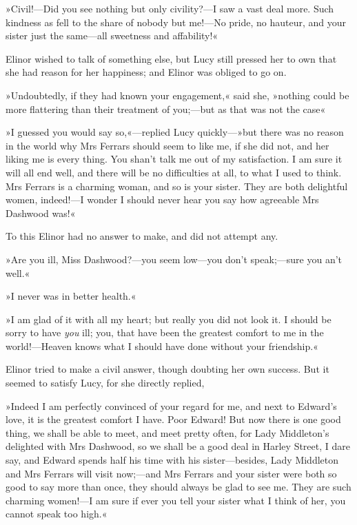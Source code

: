 »Civil!—Did you see nothing but only civility?—I saw a vast deal more. Such kindness as fell to the share of nobody but me!—No pride, no hauteur, and your sister just the same—all sweetness and affability!«

Elinor wished to talk of something else, but Lucy still pressed her to own that she had reason for her happiness; and Elinor was obliged to go on.

»Undoubtedly, if they had known your engagement,« said she, »nothing could be more flattering than their treatment of you;—but as that was not the case\longdash«

»I guessed you would say so,«—replied Lucy quickly—»but there was no reason in the world why Mrs Ferrars should seem to like me, if she did not, and her liking me is every thing. You shan’t talk me out of my satisfaction. I am sure it will all end well, and there will be no difficulties at all, to what I used to think. Mrs Ferrars is a charming woman, and so is your sister. They are both delightful women, indeed!—I wonder I should never hear you say how agreeable Mrs Dashwood was!«

To this Elinor had no answer to make, and did not attempt any.

»Are you ill, Miss Dashwood?—you seem low—you don’t speak;—sure you an’t well.«

»I never was in better health.«

»I am glad of it with all my heart; but really you did not look it. I should be sorry to have \textit{you} ill; you, that have been the greatest comfort to me in the world!—Heaven knows what I should have done without your friendship.«

Elinor tried to make a civil answer, though doubting her own success. But it seemed to satisfy Lucy, for she directly replied,

»Indeed I am perfectly convinced of your regard for me, and next to Edward’s love, it is the greatest comfort I have. Poor Edward! But now there is one good thing, we shall be able to meet, and meet pretty often, for Lady Middleton’s delighted with Mrs Dashwood, so we shall be a good deal in Harley Street, I dare say, and Edward spends half his time with his sister—besides, Lady Middleton and Mrs Ferrars will visit now;—and Mrs Ferrars and your sister were both so good to say more than once, they should always be glad to see me. They are such charming women!—I am sure if ever you tell your sister what I think of her, you cannot speak too high.«

